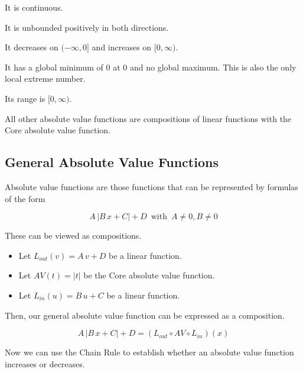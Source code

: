 \documentclass{ximera}
\begin{document}
It is continuous.

It is unbounded positively in both directions.

It decreases on $(-\infty, 0]$ and increases on $[0, \infty)$.

It has a global minimum of $0$ at $0$ and no global maximum.  This is also the only local extreme number.

Its range is $[0, \infty)$.



All other absolute value functions are compositions of linear functions with the Core absolute value function.












\subsection*{General Absolute Value Functions}

Absolute value functions are those functions that can be represented by formulas of the form


\[
A \, |B \, x + C| + D  \, \text{ with }  \, A \ne 0, B \ne 0
\]



These can be viewed as compositions.




\begin{itemize}
\item Let $L_{out}(v) = A \, v + D$ be a linear function.
\item Let $AV(t) = |t|$ be the Core absolute value function.
\item Let $L_{in}(u) = B \, u + C$ be a linear function.
\end{itemize}

Then, our general absolute value function can be expressed as a composition.


\[
 A \, |B \, x + C| + D = (L_{out} \circ AV \circ L_{in})(x)
\]



Now we can use the Chain Rule to establish whether an absolute value function increases or decreases.
\end{document}
